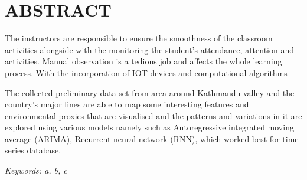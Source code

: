 \newpage
\section*{ABSTRACT}
The instructors are responsible to ensure the smoothness of the classroom activities alongside with the monitoring the student's attendance, attention and activities. Manual observation is a tedious job and affects the whole learning process. With the incorporation of IOT devices and computational algorithms 

The collected preliminary data-set from area around Kathmandu valley and the country's major lines are able to map some interesting features and environmental proxies that are visualised and the patterns and variations in it are explored using various models namely such as Autoregressive integrated moving average (ARIMA), Recurrent neural network (RNN), which worked best for time series database. 



\textit {Keywords:  a, b, c }